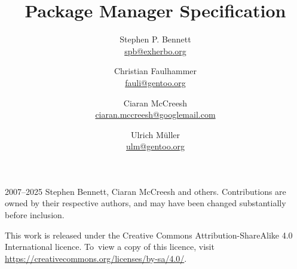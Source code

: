 \documentclass{pms}
\title{Package Manager Specification}
\author{%
    Stephen P. Bennett \\
    \href{mailto:spb@exherbo.org}{spb@exherbo.org}
    \and
    Christian Faulhammer \\
    \href{mailto:fauli@gentoo.org}{fauli@gentoo.org}
    \and
    Ciaran McCreesh \\
    \href{mailto:ciaran.mccreesh@googlemail.com}{ciaran.mccreesh@googlemail.com}
    \and
    Ulrich Müller \\
    \href{mailto:ulm@gentoo.org}{ulm@gentoo.org}
}
\begin{document}
\maketitle

\thispagestyle{empty}
\vspace*{\fill}
{%
    \small
    \textcopyright{} 2007--2025 Stephen Bennett, Ciaran McCreesh and others. Contributions are owned
    by their respective authors, and may have been changed substantially before inclusion.

    This work is released under the Creative Commons Attribution-ShareAlike 4.0 International
    licence. To~view a copy of this licence, visit
    \url{https://creativecommons.org/licenses/by-sa/4.0/}.

    \commitinfo
}

\tableofcontents
\listofalgorithms
\listoflistings
\listoftables



















\appendix



\end{document}

